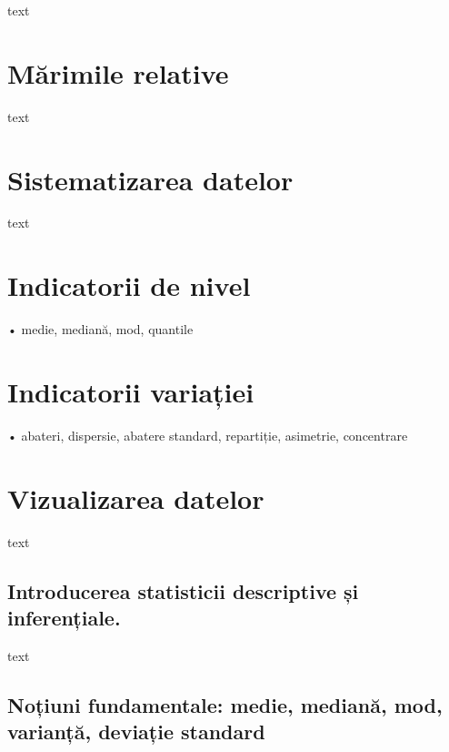 \documentclass[
  11pt,
  b5paper,
  nottoc]{book}
\begin{document}
text

\hypertarget{mux103rimile-relative}{%
\section{Mărimile relative}\label{mux103rimile-relative}}

text

\hypertarget{sistematizarea-datelor}{%
\section{Sistematizarea datelor}\label{sistematizarea-datelor}}

text

\hypertarget{indicatorii-de-nivel}{%
\section{Indicatorii de nivel}\label{indicatorii-de-nivel}}

• medie, mediană, mod, quantile

\hypertarget{indicatorii-variaux21biei}{%
\section{Indicatorii variației}\label{indicatorii-variaux21biei}}

• abateri, dispersie, abatere standard, repartiție, asimetrie,
concentrare

\hypertarget{vizualizarea-datelor}{%
\section{Vizualizarea datelor}\label{vizualizarea-datelor}}

text

\hypertarget{introducerea-statisticii-descriptive-ux219i-inferenux21biale.}{%
\subsection{Introducerea statisticii descriptive și
inferențiale.}\label{introducerea-statisticii-descriptive-ux219i-inferenux21biale.}}

text

\hypertarget{noux21biuni-fundamentale-medie-medianux103-mod-varianux21bux103-deviaux21bie-standard}{%
\subsection{Noțiuni fundamentale: medie, mediană, mod, varianță,
deviație
standard}\label{noux21biuni-fundamentale-medie-medianux103-mod-varianux21bux103-deviaux21bie-standard}}
\end{document}
